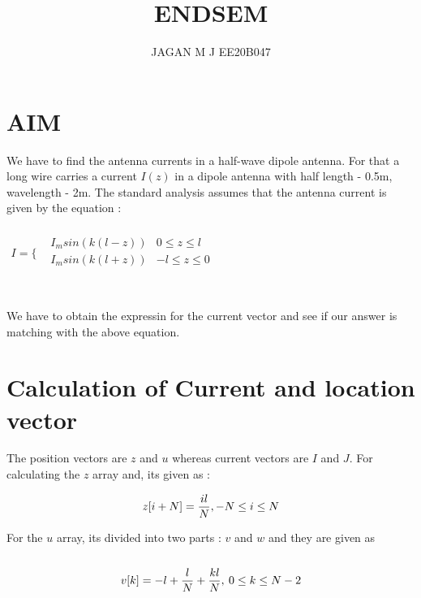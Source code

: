 \documentclass[15pt,a4paper]{article}
\begin{document}
\title{ENDSEM}
\author{JAGAN M J EE20B047}
\maketitle


\section{AIM}
We have to find the antenna currents in a half-wave dipole antenna. For that a long wire carries a current $I(z)$ in a dipole antenna with half length - 0.5m, wavelength - 2m. The standard analysis assumes that the antenna current is given by the equation : \\\\

$
\begin{array}{cc}
I = 
   \Bigg\{ & 
    \begin{array}{cc}
      I_msin(k(l - z)) & 0\leq z\leq l\\
      I_msin(k(l + z)) & -l\leq z\leq 0\\
    \end{array}
\end{array}
$
\\\\\\We have to obtain the expressin for the current vector and see if our answer is matching with the above equation.\\

\section{Calculation of Current and location vector}
The position vectors are $z$ and $u$ whereas current vectors are $I$ and $J$. For calculating the $z$ array and, its given as : 

\begin{equation*}
z[i + N] = \frac{il}{N} , -N\leq i \leq N\\\\\newline
\end{equation*}


For the $u$ array, its divided into two parts : $v$ and $w$ and they are given as \\\\

\begin{equation*}
v[k] = -l + \frac{l}{N} + \frac{kl}{N} ,\>   0\leq k \leq N -2\\\\
\end{equation*}
\end{document}
